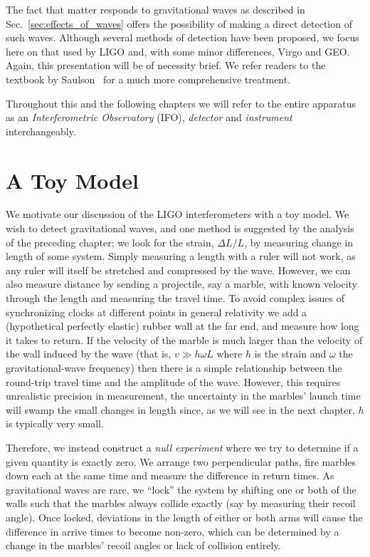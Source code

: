 The fact that matter responds to gravitational waves as described in
Sec.~\ref{sec:effects_of_waves} offers the possibility of making a
direct detection of such waves.  Although several methods of detection
have been proposed, we focus here on that used by LIGO and, with some
minor differences, Virgo and GEO.  Again, this presentation will be of
necessity brief.  We refer readers to the textbook by
Saulson~\cite{Saulson:1994} for a much more comprehensive treatment.

Throughout this and the following chapters we will refer to 
the entire apparatus as an \emph{Interferometric Observatory}
(IFO), \emph{detector} and \emph{instrument} interchangeably.

\section{A Toy Model}

We motivate our discussion of the LIGO interferometers with a toy
model.  We wish to detect gravitational waves, and one method is
suggested by the analysis of the preceding chapter; we look for the
strain, $\Delta L/L$, by measuring change in length of some system.
Simply measuring a length with a ruler will not work, as any ruler
will itself be stretched and compressed by the wave.  However, we can
also measure distance by sending a projectile, say a marble, with
known velocity through the length and measuring the travel time.  To
avoid complex issues of synchronizing clocks at different points in
general relativity we add a (hypothetical perfectly elastic) rubber
wall at the far end, and measure how long it takes to return.  If the
velocity of the marble is much larger than the velocity of the wall
induced by the wave (that is, $v \gg h \omega L$ where $h$ is the
strain and $\omega$ the gravitational-wave frequency) then there is a
simple relationship between the round-trip travel time and the
amplitude of the wave.  However, this requires unrealistic precision
in measurement, the uncertainty in the marbles' launch time will swamp
the small changes in length since, as we will see in the next chapter,
$h$ is typically very small.

Therefore, we instead construct a \emph{null experiment} where we try
to determine if a given quantity is exactly zero.  We arrange two
perpendicular paths, fire marbles down each at the same time and
measure the difference in return times.  As gravitational waves are
rare, we ``lock'' the system by shifting one or both of the walls such
that the marbles always collide exactly (say by measuring their recoil
angle).  Once locked, deviations in the length of either or both arms
will cause the difference in arrive times to become non-zero, which
can be determined by a change in the marbles' recoil angles or lack of
collision entirely.


